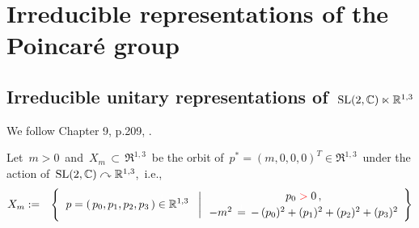 

\chapter{Irreducible representations of the Poincaré group}
\setcounter{theorem}{0}
\setcounter{equation}{0}


\renewcommand{\theenumi}{\roman{enumi}}
\renewcommand{\labelenumi}{\textnormal{(\theenumi)}$\;\;$}



\vskip 1.0cm

\vskip 1.0cm

\vskip 1.0cm

\vskip 1.0cm

%


\vskip 1.0cm
\section{Irreducible unitary representations of \,$\textnormal{SL}(2,\mathbb{C}) \ltimes \mathbb{R}^{1,3}$}


We follow Chapter 9, p.209, \cite{Talagrand2022}.

\vskip 0.5cm
\noindent
Let \,$m > 0$\, and
\,$X_{m} \,\subset\, \Re^{1,3}$\,
be the orbit of
\,$p^{*} = (m,0,0,0)^{T} \in \Re^{1,3}$\,
under the action of
\,$\textnormal{SL}(2,\mathbb{C}) \curvearrowright \mathbb{R}^{1,3}$,\,
i.e.,
\begin{eqnarray*}
X_{m}
& := &
	\left\{\;\,
		\left.
		p = (\,p_{0},p_{1},p_{2},p_{3}\,)
		\overset{{\color{white}1}}{\in}
		\Re^{1,3}
		\;\;\;\right\vert
		\begin{array}{c}
			p_{0} \;{\color{red}>}\; 0\,,
			\\
			-m^{2} \, \overset{{\color{white}1}}{=} \, -\,(p_{0})^{2} + (p_{1})^{2} + (p_{2})^{2} + (p_{3})^{2}
			\end{array}
		\right\}
\end{eqnarray*}


